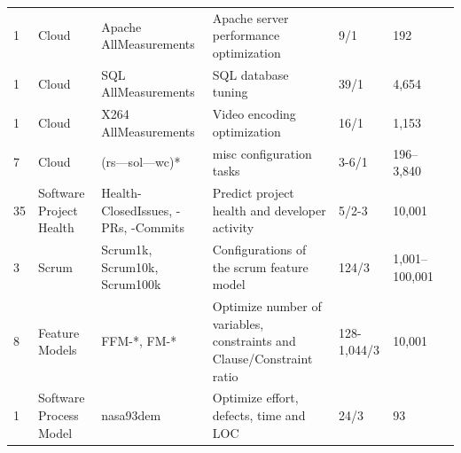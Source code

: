 \begin{table}[!t]
\begin{adjustbox}{max width=\textwidth}
\begin{tabular}{@{}C{1.4cm}@{~}p{2.5cm}p{3.9cm}p{4.0cm}p{1.1cm}p{1.4cm}c@{}}
1           & Cloud                            & Apache AllMeasurements                                                   & Apache server performance optimization                                & 9/1          & 192  &    \cite{Amiraliminimaldata, menzies2025the, chen2025accuracy, senthilkumar2024can}     \\
1           & Cloud                            & SQL AllMeasurements                                                      & SQL database tuning                                                   & 39/1         & 4,654 &    \cite{Amiraliminimaldata, menzies2025the, senthilkumar2024can}    \\
1           & Cloud                            & X264 AllMeasurements                                                     & Video encoding optimization                                           & 16/1         & 1,153  &   \cite{Amiraliminimaldata, menzies2025the, senthilkumar2024can}   \\
7           & Cloud                            & (rs—sol—wc)*                                                             & misc configuration tasks                                              & 3-6/1      & 196–3,840 &  \cite{Amiraliminimaldata, menzies2025the, senthilkumar2024can, lusstosa2025less, nairMSR18}  \\ 
 35          & Software Project Health          & Health-ClosedIssues, -PRs, -Commits                                      & Predict project health and developer activity                         & 5/2-3      & 10,001    &   \cite{Amiraliminimaldata, menzies2025the, senthilkumar2024can, lusstosa2025less,lustosa2024learning} \\ 
3           & Scrum                            & Scrum1k, Scrum10k, Scrum100k                                             & Configurations of the scrum feature model                             & 124/3      & 1,001–100,001 & \cite{Amiraliminimaldata, menzies2025the, lusstosa2025less, lustossa2024isneak} \\  
 8           & Feature Models                   & FFM-*, FM-*                                                              & Optimize number of variables, constraints and Clause/Constraint ratio & 128-1,044/3 & 10,001  &  \cite{Amiraliminimaldata, menzies2025the, lusstosa2025less, lustossa2024isneak}    \\  
1 &	Software Process Model &	nasa93dem &	Optimize effort, defects, time and LOC	& 24/3 &	93  & \cite{menzies2025the, senthilkumar2024can, lusstosa2025less, lustosa2024learning}\\

\end{tabular}
\end{adjustbox}
\end{table}
